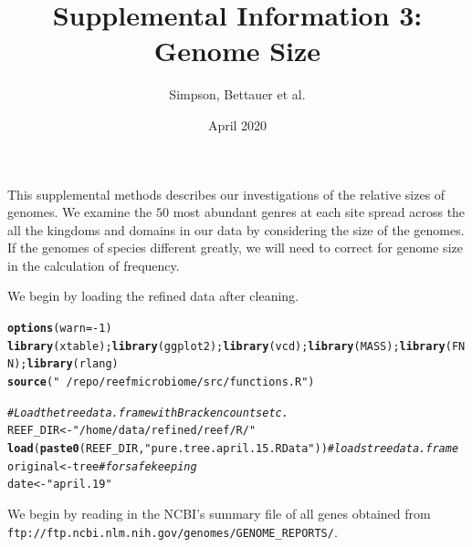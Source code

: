 \documentclass{article}\usepackage[]{graphicx}\usepackage[]{color}
\title{Supplemental Information 3: Genome Size }
\date{April 2020}
\author{Simpson, Bettauer et al.}
\makeatletter
\newcommand{\hlnum}[1]{\textcolor[rgb]{0.686,0.059,0.569}{#1}}%
\newcommand{\hlstr}[1]{\textcolor[rgb]{0.192,0.494,0.8}{#1}}%
\newcommand{\hlcom}[1]{\textcolor[rgb]{0.678,0.584,0.686}{\textit{#1}}}%
\newcommand{\hlopt}[1]{\textcolor[rgb]{0,0,0}{#1}}%
\newcommand{\hlstd}[1]{\textcolor[rgb]{0.345,0.345,0.345}{#1}}%
\newcommand{\hlkwb}[1]{\textcolor[rgb]{0.69,0.353,0.396}{#1}}%
\newcommand{\hlkwc}[1]{\textcolor[rgb]{0.333,0.667,0.333}{#1}}%
\newcommand{\hlkwd}[1]{\textcolor[rgb]{0.737,0.353,0.396}{\textbf{#1}}}%
\newenvironment{kframe}{%
 \def\at@end@of@kframe{}%
 \ifinner\ifhmode%
  \def\at@end@of@kframe{\end{minipage}}%
  \begin{minipage}{\columnwidth}%
 \fi\fi%
 \def\FrameCommand##1{\hskip\@totalleftmargin \hskip-\fboxsep
 \colorbox{shadecolor}{##1}\hskip-\fboxsep
     \hskip-\linewidth \hskip-\@totalleftmargin \hskip\columnwidth}%
 \MakeFramed {\advance\hsize-\width
   \@totalleftmargin\z@ \linewidth\hsize
   \@setminipage}}%
 {\par\unskip\endMakeFramed%
 \at@end@of@kframe}
\newenvironment{knitrout}{}{} %
\makeatother
\begin{document}

\maketitle

This supplemental methods describes our investigations of the relative sizes of genomes.
We examine the $50$ most abundant 
 genres at each site spread across the all the kingdoms and domains in our data by considering the size of the genomes. 
If the genomes of species different greatly, we will need to correct for genome size in the calculation
of frequency.

We begin by loading the refined data after cleaning.
\begin{knitrout}
\color{fgcolor}\begin{kframe}
\begin{alltt}
\hlkwd{options}\hlstd{(}\hlkwc{warn} \hlstd{=} \hlopt{-}\hlnum{1}\hlstd{)}
\hlkwd{library}\hlstd{(xtable);} \hlkwd{library}\hlstd{(ggplot2);} \hlkwd{library}\hlstd{(vcd);} \hlkwd{library}\hlstd{(MASS);} \hlkwd{library}\hlstd{(FNN);} \hlkwd{library}\hlstd{(rlang)}
\hlkwd{source}\hlstd{(}\hlstr{"~/repo/reefmicrobiome/src/functions.R"}\hlstd{)}

\hlcom{# Load the tree data.frame with Bracken counts etc.}
\hlstd{REEF_DIR} \hlkwb{<-} \hlstr{"/home/data/refined/reef/R/"}
\hlkwd{load}\hlstd{(} \hlkwd{paste0}\hlstd{(REEF_DIR,} \hlstr{"pure.tree.april.15.RData"} \hlstd{) )}  \hlcom{# loads tree data.frame}
\hlstd{original} \hlkwb{<-} \hlstd{tree} \hlcom{# for safe keeping}
\hlstd{date} \hlkwb{<-} \hlstr{"april.19"}
\end{alltt}
\end{kframe}
\end{knitrout}

We begin by reading in the NCBI's summary file of all genes obtained from {\tt ftp://ftp.ncbi.nlm.nih.gov/genomes/GENOME\_REPORTS/}.
\end{document}
